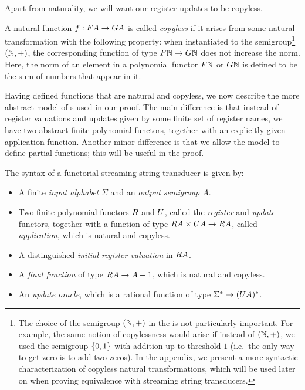 Apart from naturality, we will want our register updates to be copyless. 

\begin{definition} \label{def:copyless} A natural function $f : \functor A \to \functorg A$ is  called \emph{copyless} if it arises from some natural transformation with the following property:  when instantiated to the semigroup\footnote{The choice of the semigroup $({\mathbb N},+)$ in the  is not particularly important. For example, the same notion of copylessness would arise if instead of $({\mathbb N},+)$, we used the semigroup $\{0,1\}$ with addition up to threshold $1$ (i.e.~the only way to get zero is to add two zeros). In the appendix, we present a more syntactic characterization of copyless natural transformations, which will be used later on when proving equivalence with streaming string transducers. 
    } $({\mathbb N},+)$, the corresponding function of type $\functor \Nat \to \functorg \Nat$ 
    does not increase the norm. Here, the norm of an element in a polynomial functor $\functor \Nat$ or $\functorg \Nat$ is defined to be the sum of numbers that appear in it.
\end{definition}





Having defined functions that are natural and copyless, we now describe the more abstract model of \sst{}s used in our proof. The main difference is that instead of register valuations and updates given by some finite set of register names, we have two abstract finite polynomial functors, together with an explicitly given application function. Another minor difference is that we allow the model to define partial functions; this will be useful in the proof.


\begin{definition}\label{def:functorial-sst}
    The syntax of a functorial streaming string transducer is given by:
    \begin{itemize}
        \item A finite \emph{input alphabet} $\Sigma$ and an \emph{output semigroup $A$}.
    \item Two finite polynomial functors $\functorr$ and $\functoru$, called the \emph{register} and \emph{update} functors, together with a function of type $\functorr A \times \functoru A \to \functorr A$, called \emph{application}, which is natural and copyless.
    \item A distinguished \emph{initial register valuation}  in $\functorr A$.
    \item A \emph{final function} of type $\functorr A \to A + 1$, which is natural and copyless.
    \item An \emph{update oracle}, which is a rational function of type $\Sigma^* \to (\functoru A)^*$.
    \end{itemize}
\end{definition}

